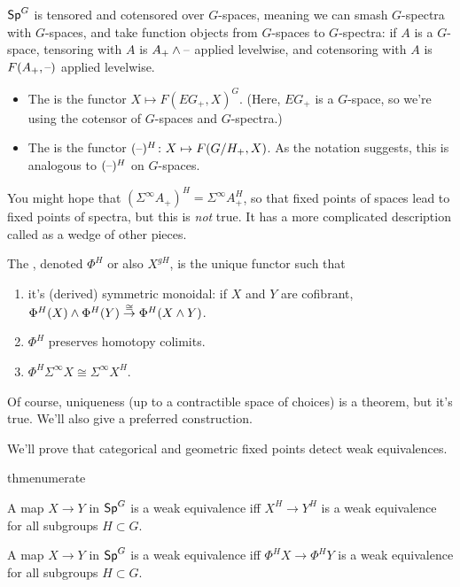 $\mathsf{Sp}^G$ is tensored and cotensored over $G$-spaces, meaning we can smash $G$-spectra with $G$-spaces, and take
function objects from $G$-spaces to $G$-spectra: if $A$ is a $G$-space, tensoring with $A$ is $A_+\wedge\text{--}$
applied levelwise, and cotensoring with $A$ is $F(A_+,\text{--})$ applied levelwise.
\begin{defn}\hfill
\label{spectra_fixed_points}
\begin{itemize}
	\item The  is the functor $X\mapsto F(EG_+, X)^G$. (Here, $EG_+$ is a $G$-space, so
	we're using the cotensor of $G$-spaces and $G$-spectra.)
	\item The  is the functor $(\bl)^H\colon X\mapsto F(G/H_+, X)$. As the notation
	suggests, this is analogous to $(\text{--})^H$ on $G$-spaces.
\end{itemize}
\end{defn}
\begin{warn}
You might hope that $(\Sigma^\infty A_+)^H = \Sigma^\infty A_+^H$, so that fixed points of spaces lead to fixed
points of spectra, but this is \emph{not} true. It has a more complicated description called
 as a wedge of other pieces.
\end{warn}
\begin{defn}
The , denoted $\Phi^H$ or also $X^{gH}$, is the unique functor
such that
\begin{enumerate}
	\item it's (derived) symmetric monoidal: if $X$ and $Y$ are cofibrant,
	$\Phi^H(X)\wedge\Phi^H(Y)\stackrel\cong\to\Phi^H(X\wedge Y)$.
	\item $\Phi^H$ preserves homotopy colimits.
	\item $\Phi^H\Sigma^\infty X \cong \Sigma^\infty X^H$.
\end{enumerate}
\end{defn}
Of course, uniqueness (up to a contractible space of choices) is a theorem, but it's true. We'll also give a
preferred construction.

We'll prove that categorical and geometric fixed points detect weak equivalences.
\begin{comp}{thm}{enumerate}
	\item A map $X\to Y$ in $\mathsf{Sp}^G$ is a weak equivalence iff $X^H\to Y^H$ is a weak equivalence for all subgroups
	$H\subset G$.
	\item A map $X\to Y$ in $\mathsf{Sp}^G$ is a weak equivalence iff $\Phi^H X\to \Phi^H Y$ is a weak equivalence for all
	subgroups $H\subset G$.
\end{comp}

